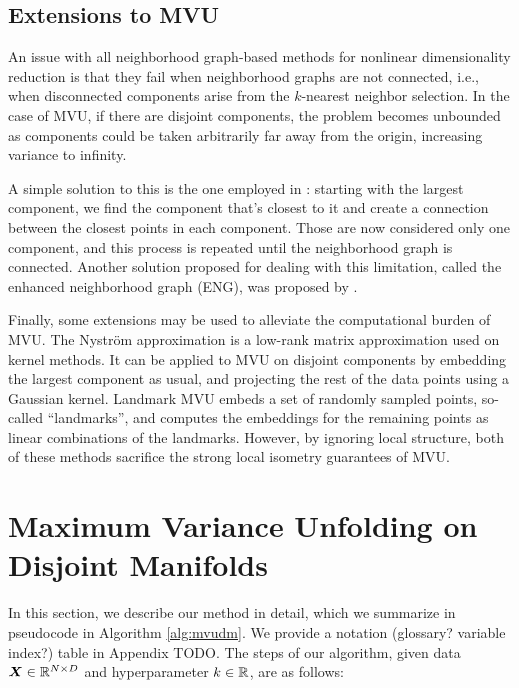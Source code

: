\documentclass{article} %
\begin{document}


\subsection{Extensions to MVU}\label{sec:mvu-extensions}

An issue with all neighborhood graph-based methods for nonlinear dimensionality reduction is that they fail when neighborhood graphs are not connected, i.e., when disconnected components arise from the $k$-nearest neighbor selection. In the case of MVU, if there are disjoint components, the problem becomes unbounded as components could be taken arbitrarily far away from the origin, increasing variance to infinity.

A simple solution to this is the one employed in \citet{dr-review}: starting with the largest component, we find the component that's closest to it and create a connection between the closest points in each component. Those are now considered only one component, and this process is repeated until the neighborhood graph is connected. Another solution proposed for dealing with this limitation, called the enhanced neighborhood graph (ENG), was proposed by \citet{eng}.

Finally, some extensions may be used to alleviate the computational burden of MVU. The Nyström approximation \citep{nystrom} is a low-rank matrix approximation used on kernel methods. It can be applied to MVU on disjoint components by embedding the largest component as usual, and projecting the rest of the data points using a Gaussian kernel. Landmark MVU \citep{landmark-mvu} embeds a set of randomly sampled points, so-called ``landmarks'', and computes the embeddings for the remaining points as linear combinations of the landmarks. However, by ignoring local structure, both of these methods sacrifice the strong local isometry guarantees of MVU.

\section{Maximum Variance Unfolding on Disjoint Manifolds}\label{sec:proposed-approach}

In this section, we describe our method in detail, which we summarize in pseudocode in Algorithm \ref{alg:mvudm}. We provide a notation (glossary? variable index?) table in Appendix TODO. The steps of our algorithm, given data $\bm{X}\in\mathbb{R}^{N\times D}$ and hyperparameter $k\in\mathbb{R}$, are as follows:
\end{document}

